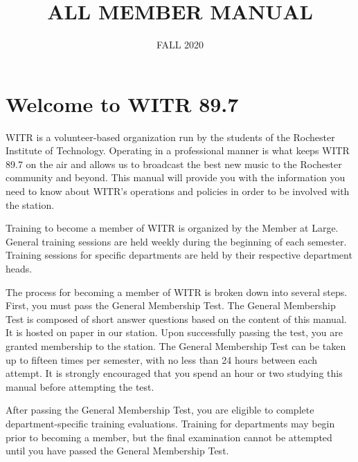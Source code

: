 \documentclass{witrman}
\date{FALL 2020}
\title{ALL MEMBER MANUAL}
\begin{document}
\maketitle  %

\maketoc{}  %

\setpagebg{}

\mbox{}
\vspace{16pt}
\chapter{Welcome to WITR 89.7}

WITR is a volunteer-based organization run by the students of the Rochester
Institute of Technology.  Operating in a professional manner is what keeps WITR
89.7 on the air and allows us to broadcast the best new music to the Rochester
community and beyond.  This manual will provide you with the information you
need to know about WITR’s operations and policies in order to be involved with
the station.

Training to become a member of WITR is organized by the Member at Large.
General training sessions are held weekly during the beginning of each semester.
Training sessions for specific departments are held by their respective
department heads.

The process for becoming a member of WITR is broken down into several steps.
First, you must pass the General Membership Test.  The General Membership Test
is composed of short answer questions based on the content of this manual.  It
is hosted on paper in our station.  Upon successfully passing the test, you are
granted membership to the station.  The General Membership Test can be taken up
to fifteen times per semester, with no less than 24 hours between each attempt.
It is strongly encouraged that you spend an hour or two studying this manual
before attempting the test.

After passing the General Membership Test, you are eligible to complete
department-specific training evaluations.  Training for departments may begin
prior to becoming a member, but the final examination cannot be attempted until
you have passed the General Membership Test.
\end{document}

